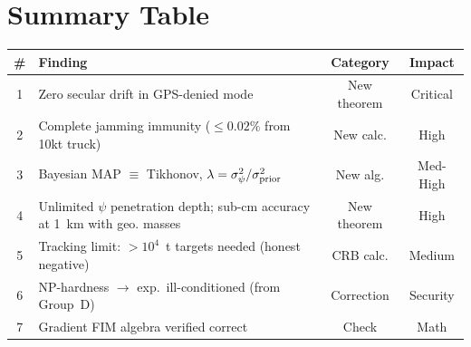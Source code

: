 \documentclass[aps,prd,twocolumn,superscriptaddress,nofootinbib]{revtex4-2}
\begin{document}
\section{Summary Table}
\label{sec:summary}

\begin{center}
\begin{tabular}{clcc}
\toprule
\# & Finding & Category & Impact \\
\midrule
1 & Zero secular drift in GPS-denied mode & New theorem & Critical \\
2 & Complete jamming immunity ($\leq 0.02\%$ from 10kt truck) & New calc. & High \\
3 & Bayesian MAP $\equiv$ Tikhonov, $\lambda = \sigma_\psi^2/\sigma_{\rm prior}^2$ & New alg. & Med-High \\
4 & Unlimited $\psi$ penetration depth; sub-cm accuracy at 1~km with geo. masses & New theorem & High \\
5 & Tracking limit: $>10^4$~t targets needed (honest negative) & CRB calc. & Medium \\
6 & NP-hardness $\to$ exp.\ ill-conditioned (from Group~D) & Correction & Security \\
7 & Gradient FIM algebra verified correct & Check & Math \\
\bottomrule
\end{tabular}
\end{center}
\end{document}
